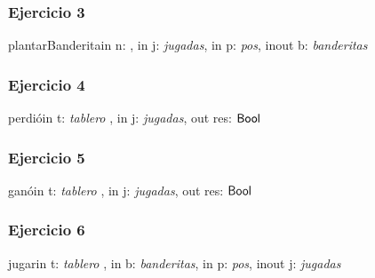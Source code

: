\documentclass[a4paper]{article}
\begin{document}
\subsubsection{Ejercicio 3}
\begin{addmargin}[4em]{1em}
\begin{proc}{plantarBanderita}{in n: \ent , in j: \textit{jugadas},
                           			in p: \textit{pos},
						   			inout b: \textit{banderitas}}{

									}
\end{proc}
\end{addmargin}


\subsubsection{Ejercicio 4}
\begin{addmargin}[4em]{1em}
\begin{proc}{perdi\'o}{in t: \textit{tablero} , in j: \textit{jugadas},
					   out res: $\mathsf{Bool}$}{}
							   
\end{proc}
\end{addmargin}


\subsubsection{Ejercicio 5}
\begin{addmargin}[4em]{1em}
\begin{proc}{gan\'o}{in t: \textit{tablero} , in j: \textit{jugadas},
	                 out res: $\mathsf{Bool}$}{}
			
\end{proc}
\end{addmargin}


\subsubsection{Ejercicio 6}
\begin{addmargin}[4em]{1em}
\begin{proc}{jugar}{in t: \textit{tablero} , in b: \textit{banderitas},
				    in p: \textit{pos},
	                inout j: \textit{jugadas}}{}
			
\end{proc}
\end{addmargin}
\end{document}
